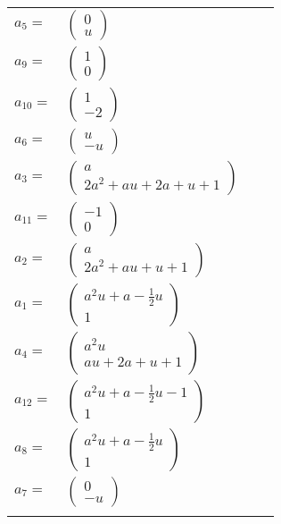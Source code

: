 \documentclass[1p]{elsarticle_modified}
\theoremstyle{definition}
\begin{document}
\begin{tabular}{m{7pt} m{180pt} m{7pt} m{180pt} }
\flushright $a_{5}=$&$\begin{pmatrix}0\\u\end{pmatrix}$ \\
\flushright $a_{9}=$&$\begin{pmatrix}1\\0\end{pmatrix}$ \\
\flushright $a_{10}=$&$\begin{pmatrix}1\\-2\end{pmatrix}$ \\
\flushright $a_{6}=$&$\begin{pmatrix}u\\- u\end{pmatrix}$ \\
\flushright $a_{3}=$&$\begin{pmatrix}a\\2 a^2+a u+2 a+u+1\end{pmatrix}$ \\
\flushright $a_{11}=$&$\begin{pmatrix}-1\\0\end{pmatrix}$ \\
\flushright $a_{2}=$&$\begin{pmatrix}a\\2 a^2+a u+u+1\end{pmatrix}$ \\
\flushright $a_{1}=$&$\begin{pmatrix}a^2 u+a-\frac{1}{2} u\\1\end{pmatrix}$ \\
\flushright $a_{4}=$&$\begin{pmatrix}a^2 u\\a u+2 a+u+1\end{pmatrix}$ \\
\flushright $a_{12}=$&$\begin{pmatrix}a^2 u+a-\frac{1}{2} u-1\\1\end{pmatrix}$ \\
\flushright $a_{8}=$&$\begin{pmatrix}a^2 u+a-\frac{1}{2} u\\1\end{pmatrix}$ \\
\flushright $a_{7}=$&$\begin{pmatrix}0\\- u\end{pmatrix}$\\&\end{tabular}
\end{document}
